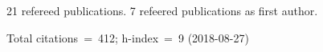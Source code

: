 21 refereed publications. 7 refeered publications as first author.

               Total citations~=~412; h-index~=~9 (2018-08-27)